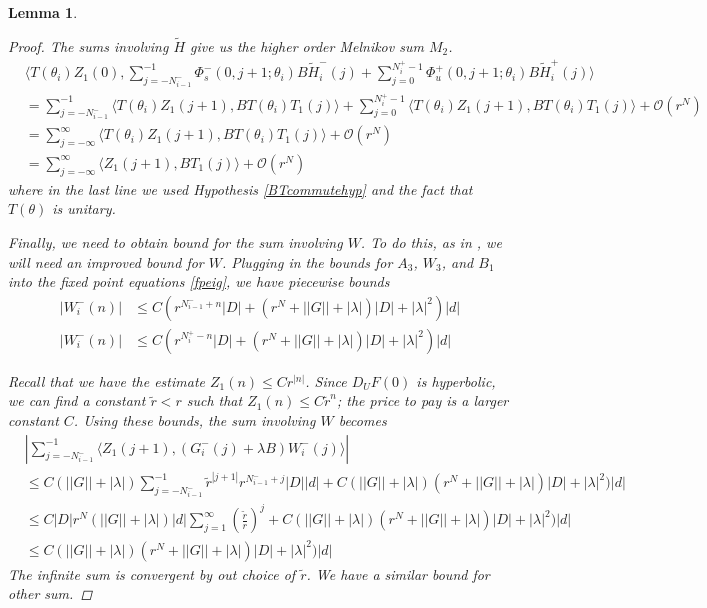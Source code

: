 \documentclass[12pt]{article}
\newtheorem{lemma}{Lemma}
\begin{document}
\begin{lemma}
\begin{proof}
The sums involving $\tilde{H}$ give us the higher order Melnikov sum $M_2$.
\begin{align*}
&\langle T(\theta_i) Z_1(0), \sum_{j = -N_{i-1}^-}^{-1} \Phi_s^-(0, j+1; \theta_i) B \tilde{H}_i^-(j) + \sum_{j = 0}^{N_i^+-1} \Phi_u^+(0, j+1; \theta_i) B \tilde{H}_i^+(j) \rangle \\
&= \sum_{j = -N_{i-1}^-}^{-1} \langle T(\theta_i) Z_1(j+1), B T(\theta_i) T_1(j) \rangle + \sum_{j = 0}^{N_i^+-1} \langle T(\theta_i) Z_1(j+1), B T(\theta_i) T_1(j) \rangle + \mathcal{O}(r^N)\\
&= \sum_{j = -\infty}^{\infty} \langle T(\theta_i) Z_1(j+1), B T(\theta_i) T_1(j)\rangle + \mathcal{O}(r^N) \\
&= \sum_{j = -\infty}^{\infty} \langle Z_1(j+1), B T_1(j)\rangle + \mathcal{O}(r^N)
\end{align*}
where in the last line we used Hypothesis \ref{BTcommutehyp} and the fact that $T(\theta)$ is unitary.

Finally, we need to obtain bound for the sum involving $W$. To do this, as in \cite{Sandstede1998}, we will need an improved bound for $W$. Plugging in the bounds for $A_3$, $W_3$, and $B_1$ into the fixed point equations \eqref{fpeig}, we have piecewise bounds
\begin{align*}
|W_i^-(n)| &\leq C( r^{N_{i-1}^- + n}|D| +  
(r^N + ||G|| + |\lambda|)|D| + |\lambda|^2 )|d| \\
|W_i^-(n)| &\leq C( r^{N_i^+ - n}|D| +  
(r^N + ||G|| + |\lambda|)|D| + |\lambda|^2 )|d|
\end{align*}

Recall that we have the estimate $Z_1(n) \leq C r^{|n|}$. Since $D_U F(0)$ is hyperbolic, we can find a constant $\tilde{r} < r$ such that $Z_1(n) \leq C \tilde{r}^n$; the price to pay is a larger constant $C$. Using these bounds, the sum involving $W$ becomes
\begin{align*}
&\left| \sum_{j = -N_{i-1}^-}^{-1} \langle Z_1(j+1), 
(G_i^-(j) + \lambda B) W_i^-(j) \rangle \right| \\
&\leq C (||G|| + |\lambda|) \sum_{j = -N_{i-1}^-}^{-1} \tilde{r}^{|j+1|} r^{N_{i-1}^- + j}|D||d| + C (||G|| + |\lambda|)(r^N + ||G|| + |\lambda|)|D| + |\lambda|^2 )|d| \\
&\leq C |D| r^N (||G|| + |\lambda|)|d| \sum_{j = 1}^\infty \left( \frac{\tilde{r}}{r}\right)^j + C (||G|| + |\lambda|)(r^N + ||G|| + |\lambda|)|D| + |\lambda|^2 )|d| \\
&\leq C (||G|| + |\lambda|)(r^N + ||G|| + |\lambda|)|D| + |\lambda|^2 )|d|
\end{align*}
The infinite sum is convergent by out choice of $\tilde{r}$. We have a similar bound for other sum.


\end{proof}
\end{lemma}
\end{document}
